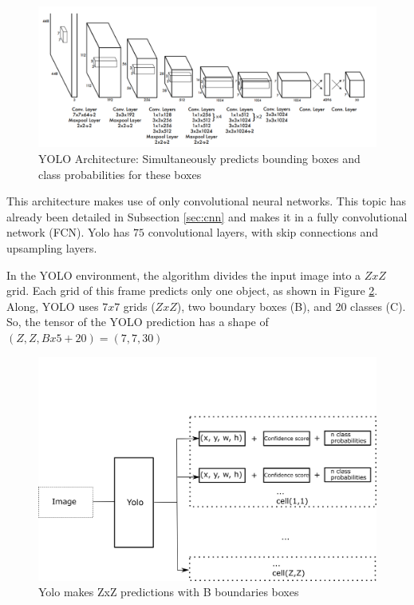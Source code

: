 \begin{figure}[H]
\centering
\includegraphics[width=\textwidth]{imagens/yolo.png}
\caption{YOLO Architecture: Simultaneously predicts bounding boxes and class probabilities for these boxes \cite{redmon2016you}}
\label{fig:yolo_arc}
\end{figure}

This architecture makes use of only convolutional neural networks. This topic has already been detailed in Subsection \ref{sec:cnn} and makes it in a fully convolutional network (FCN). Yolo has $75$ convolutional layers, with skip connections and upsampling layers.  





In the YOLO environment, the algorithm divides the input image into a $ZxZ$ grid. Each grid of this frame predicts only one object, as shown in Figure \ref{fig:yolo_flow}. Along, YOLO uses $7x7$ grids ($ZxZ$), two boundary boxes (B), and 20 classes (C). So, the tensor of the YOLO prediction has a shape of $(Z, Z, Bx5+20) = (7,7,30)$


\begin{figure}[H]
\centering
\includegraphics[scale=0.7]{imagens/yolo_flow.png}
\caption{Yolo makes ZxZ predictions with B boundaries boxes}
\label{fig:yolo_flow}
\end{figure}

